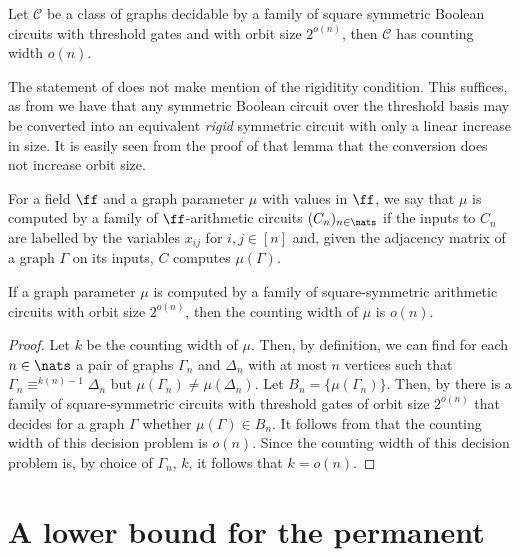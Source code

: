 \documentclass{toc}
\begin{document}
\begin{theorem}
  Let $\mathcal{C}$ be a class of graphs decidable by a family of square
  symmetric Boolean circuits with threshold gates and with orbit size $2^{o(n)}$, then
  $\mathcal{C}$ has counting width $o(n)$.
  \label{thm:cw-graphs}
\end{theorem}

The statement of  does not make mention of the rigiditity condition. This suffices, as from \cite[Lemma~7]{AndersonD17} we have that any symmetric Boolean circuit over the threshold basis may be converted into an equivalent \emph{rigid} symmetric circuit with only a linear increase in size.  It is easily seen from the proof of that lemma that the conversion does not increase orbit size.

For a field $\ff$ and a graph parameter $\mu$ with values in $\ff$, we say that $\mu$ is computed by a family of $\ff$-arithmetic circuits $(C_n)_{n \in \nats}$ if the inputs to $C_n$ are labelled by the variables $x_{ij}$ for $i,j \in [n]$ and,  given the adjacency matrix of a graph $\Gamma$ on its inputs, $C$ computes $\mu(\Gamma)$.


\begin{corollary}
  If a graph parameter $\mu$ is computed by a
%
family of square-symmetric %
arithmetic circuits with orbit size $2^{o(n)}$,
then the counting width of $\mu$ is $o(n)$.
  \label{cor:arithmetic-supports-square}
\end{corollary}
\begin{proof}
  Let $k$ be the counting width of $\mu$.  Then, by definition, we can find for each $n \in  \nats$ a pair of graphs $\Gamma_n$ and $\Delta_n$ with at most $n$ vertices such that
  $\Gamma_n \equiv^{k(n) - 1} \Delta_n$ but $\mu (\Gamma_n) \neq \mu(\Delta_n)$.  Let $B_n =
  \{\mu(\Gamma_n)\}$.  Then, by   there 
is a family of
  square-symmetric circuits with threshold gates of orbit size $2^{o(n)}$
  that decides for a graph $\Gamma$
  whether $\mu (\Gamma) \in B_n$.   It follows from  that
  the counting width of this decision problem is $o(n)$.  Since the counting
  width of this decision problem is, by choice of $\Gamma_n$, $k$, it follows that
  $k = o(n)$.
\end{proof}


\section{A lower bound for the permanent} %
\label{sec:permanent}
\end{document}
